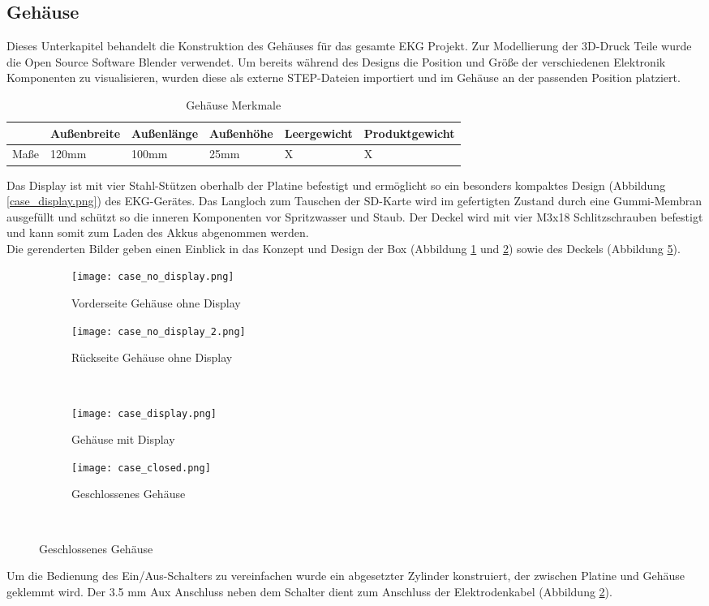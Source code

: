 \subsection{Gehäuse}
Dieses Unterkapitel behandelt die Konstruktion des Gehäuses für das gesamte EKG Projekt. Zur Modellierung der 3D-Druck Teile wurde die Open Source Software Blender verwendet. Um bereits während des Designs die Position und Größe der verschiedenen Elektronik Komponenten zu visualisieren, wurden diese als externe STEP-Dateien importiert und im Gehäuse an der passenden Position platziert.

\begin{table}[h]
\centering
\caption{Gehäuse Merkmale}
\begin{tabular}[h]{l|l|l|l|l|l}
		& Außenbreite & Außenlänge & Außenhöhe & Leergewicht & Produktgewicht \\
\hline
Maße 	& 120mm & 100mm & 25mm & X & X \\
\end{tabular}
\end{table}
\clearpage

Das Display ist mit vier Stahl-Stützen oberhalb der Platine befestigt und ermöglicht so ein besonders kompaktes Design (Abbildung \ref{case_display.png}) des EKG-Gerätes. Das Langloch zum Tauschen der SD-Karte wird im gefertigten Zustand durch eine Gummi-Membran ausgefüllt und schützt so die inneren Komponenten vor Spritzwasser und Staub. Der Deckel wird mit vier M3x18 Schlitzschrauben befestigt und kann somit zum Laden des Akkus abgenommen werden. \\
Die gerenderten Bilder geben einen Einblick in das Konzept und Design der Box (Abbildung \ref{case_no_display1} und \ref{case_no_display2}) sowie des Deckels (Abbildung \ref{case_closed}).

\begin{figure}
	\begin{subfigure}[t]{0.49\textwidth}
		\texttt{[image: case\_no\_display.png]}
		\caption{Vorderseite Gehäuse ohne Display}
		\label{case_no_display1}
	\end{subfigure}\hfill%
	\begin{subfigure}[t]{0.49\textwidth}
		\texttt{[image: case\_no\_display\_2.png]}
		\caption{Rückseite Gehäuse ohne Display}
		\label{case_no_display2}
	\end{subfigure}\\[5pt]%
	
	\begin{subfigure}[t]{0.49\textwidth}
		\texttt{[image: case\_display.png]}
		\caption{Gehäuse mit Display}
		\label{case_display}
	\end{subfigure}\hfill%
	\begin{subfigure}[t]{0.49\textwidth}
		\texttt{[image: case\_closed.png]}
		\caption{Geschlossenes Gehäuse}
		\label{case_closed} 
	\end{subfigure}\\[5pt]%

\end{figure}

Um die Bedienung des Ein/Aus-Schalters zu vereinfachen wurde ein abgesetzter Zylinder konstruiert, der zwischen Platine und Gehäuse geklemmt wird. Der 3.5 mm Aux Anschluss neben dem Schalter dient zum Anschluss der Elektrodenkabel (Abbildung \ref{case_no_display2}).
\clearpage